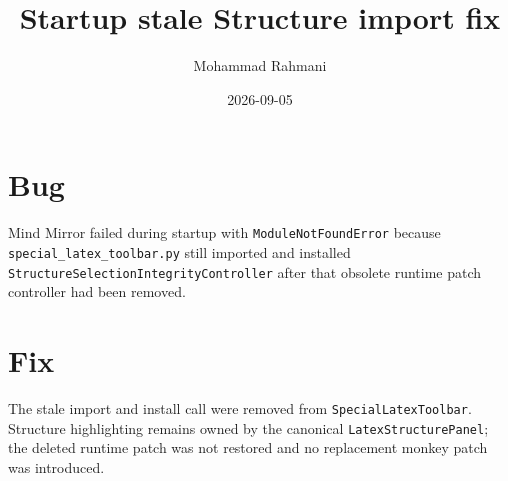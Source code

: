 \documentclass[a4paper]{article}
\title{Startup stale Structure import fix}
\date{2026-09-05}
\author{Mohammad Rahmani}
\begin{document}
   \maketitle

   \section{Bug}
   Mind Mirror failed during startup with \texttt{ModuleNotFoundError} because
   \texttt{special\_latex\_toolbar.py} still imported and installed
   \texttt{StructureSelectionIntegrityController} after that obsolete runtime
   patch controller had been removed.

   \section{Fix}
   The stale import and install call were removed from
   \texttt{SpecialLatexToolbar}. Structure highlighting remains owned by the
   canonical \texttt{LatexStructurePanel}; the deleted runtime patch was not
   restored and no replacement monkey patch was introduced.

   
   
\end{document}
